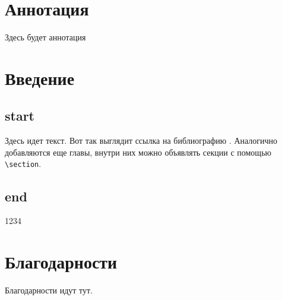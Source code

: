\documentclass{mipt-thesis-bs}
\title{}
\author{Федорец Никита Сергеевич}
\begin{document}
\mainmatter
\titlepage
\thispagestyle{empty}

\chapter*{Аннотация} 
Здесь будет аннотация

\newpage

\tableofcontents 




\chapter{Введение}
\section{start}
Здесь идет текст. Вот так выглядит ссылка на библиографию \cite{langmuir26}. 
Аналогично добавляются еще главы, внутри них можно объявлять секции с помощью \verb|\section|.
\section{end}
1234

\backmatter

\printbib

\chapter{Благодарности}

Благодарности идут тут.
\end{document}
